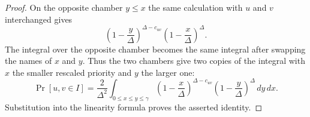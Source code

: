 \begin{proof}
On the opposite chamber $y\le x$ the same calculation with $u$ and $v$
interchanged gives
\[
\left(1-\frac{y}{\Delta}\right)^{\Delta-c_{uv}}
\left(1-\frac{x}{\Delta}\right)^\Delta .
\]
The integral over the opposite chamber becomes the same integral after
swapping the names of $x$ and $y$.  Thus the two chambers give two copies
of the integral with $x$ the smaller rescaled priority and $y$ the larger
one:
\[
\Pr[u,v\in I]
=
\frac{2}{\Delta^2}
\int_{0\le x\le y\le\gamma}
\left(1-\frac{x}{\Delta}\right)^{\Delta-c_{uv}}
\left(1-\frac{y}{\Delta}\right)^\Delta\,dy\,dx .
\]
Substitution into the linearity formula proves the asserted identity.
\end{proof}
